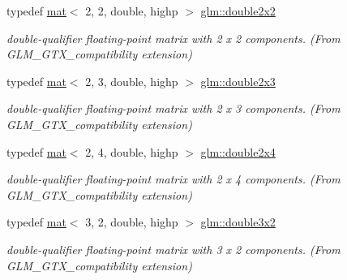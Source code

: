 \begin{DoxyCompactItemize}
typedef \hyperlink{structglm_1_1mat}{mat}$<$ 2, 2, double, highp $>$ \hyperlink{group__gtx__compatibility_ga38235425d2401904456ecbc342d87453}{glm\+::double2x2}
\begin{DoxyCompactList}\small\item\em double-\/qualifier floating-\/point matrix with 2 x 2 components. (From G\+L\+M\+\_\+\+G\+T\+X\+\_\+compatibility extension) \end{DoxyCompactList}\item 
\mbox{\label{group__gtx__compatibility_gaaf4151b4dcb70d412df4c4a1cfccd575}} 
typedef \hyperlink{structglm_1_1mat}{mat}$<$ 2, 3, double, highp $>$ \hyperlink{group__gtx__compatibility_gaaf4151b4dcb70d412df4c4a1cfccd575}{glm\+::double2x3}
\begin{DoxyCompactList}\small\item\em double-\/qualifier floating-\/point matrix with 2 x 3 components. (From G\+L\+M\+\_\+\+G\+T\+X\+\_\+compatibility extension) \end{DoxyCompactList}\item 
\mbox{\label{group__gtx__compatibility_ga64a5113afe95db296ff0593232ac772d}} 
typedef \hyperlink{structglm_1_1mat}{mat}$<$ 2, 4, double, highp $>$ \hyperlink{group__gtx__compatibility_ga64a5113afe95db296ff0593232ac772d}{glm\+::double2x4}
\begin{DoxyCompactList}\small\item\em double-\/qualifier floating-\/point matrix with 2 x 4 components. (From G\+L\+M\+\_\+\+G\+T\+X\+\_\+compatibility extension) \end{DoxyCompactList}\item 
\mbox{\label{group__gtx__compatibility_ga92075f3b0988e062b5fcd25afb67e74c}} 
typedef \hyperlink{structglm_1_1mat}{mat}$<$ 3, 2, double, highp $>$ \hyperlink{group__gtx__compatibility_ga92075f3b0988e062b5fcd25afb67e74c}{glm\+::double3x2}
\begin{DoxyCompactList}\small\item\em double-\/qualifier floating-\/point matrix with 3 x 2 components. (From G\+L\+M\+\_\+\+G\+T\+X\+\_\+compatibility extension) \end{DoxyCompactList}\item 
\mbox{\label{group__gtx__compatibility_ga7cf33790969e0985a53ff01d914bf8ef}} 

\end{DoxyCompactItemize}
